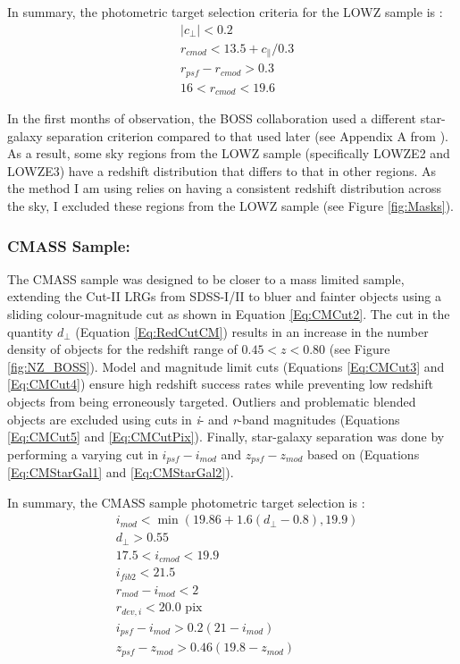 \qquad In summary, the photometric target selection criteria for the LOWZ sample is \citep{BOSSCatalogue2016}:
\begin{align}
 & |c_{\perp}| < 0.2 \label{Eq:ColourCutLZ} \\
 & r_{cmod} < 13.5 + c_{\parallel}/0.3 \label{Eq:RedSelecLZ} \\
 & r_{psf} - r_{cmod} > 0.3 \label{Eq:StarGalLZ} \\
 & 16 < r_{cmod} < 19.6 \label{Eq:FinalCutLZ}
\end{align}

\qquad In the first months of observation, the BOSS collaboration used a different star-galaxy separation criterion compared to that used later (see Appendix A from \citealt{BOSSCatalogue2016}). As a result, some sky regions from the LOWZ sample (specifically LOWZE2 and LOWZE3) have a redshift distribution that differs to that in other regions. As the method I am using relies on having a consistent redshift distribution across the sky, I excluded these regions from the LOWZ sample (see Figure \ref{fig:Masks}). 

\subsubsection{CMASS Sample:}
The CMASS sample was designed to be closer to a mass limited sample, extending the Cut-II LRGs from SDSS-I/II \citep{2001Eisenstein} to bluer and fainter objects using a sliding colour-magnitude cut as shown in Equation \eqref{Eq:CMCut2}. The cut in the quantity $d_{\perp}$ (Equation \ref{Eq:RedCutCM}) results in an increase in the number density of objects for the redshift range of $0.45 < z < 0.80$ (see Figure \ref{fig:NZ_BOSS}). Model and magnitude limit cuts (Equations \ref{Eq:CMCut3} and \ref{Eq:CMCut4}) ensure high redshift success rates while preventing low redshift objects from being erroneously targeted. Outliers and problematic blended objects are excluded using cuts in \textit{i}- and \textit{r}-band magnitudes (Equations \ref{Eq:CMCut5} and \ref{Eq:CMCutPix}). Finally, star-galaxy separation was done by performing a varying cut in $i_{psf} - i_{mod}$ and $z_{psf} - z_{mod}$ based on \cite{2006Cannon2Slaq} (Equations \ref{Eq:CMStarGal1} and \ref{Eq:CMStarGal2}).

\qquad In summary, the CMASS sample photometric target selection is \citep{BOSSCatalogue2016}:
\begin{align}
& i_{mod} < \min (19.86 + 1.6(d_{\perp}-0.8),19.9) \label{Eq:CMCut2} \\
& d_{\perp} > 0.55 \label{Eq:RedCutCM} \\
& 17.5 < i_{cmod} < 19.9 \label{Eq:CMCut3} \\
& i_{fib2} < 21.5\label{Eq:CMCut4} \\
& r_{mod} - i_{mod} < 2 \label{Eq:CMCut5} \\
& r_{dev,i} < 20.0 \text{ pix} \label{Eq:CMCutPix} \\
& i_{psf} - i_{mod} > 0.2(21-i_{mod}) \label{Eq:CMStarGal1} \\
& z_{psf} - z_{mod} > 0.46(19.8 - z_{mod}) \label{Eq:CMStarGal2}
\end{align}

